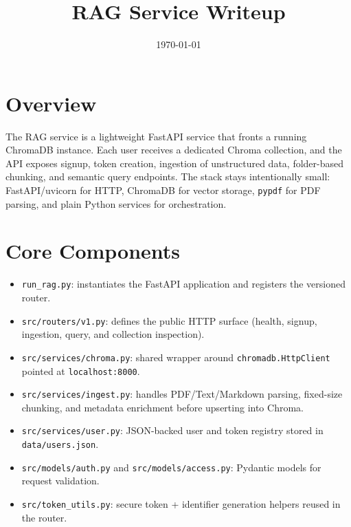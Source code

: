 \documentclass[11pt]{article}
\title{RAG Service Writeup}
\author{}
\date{\today}
\begin{document}
\maketitle

\section{Overview}
The RAG service is a lightweight FastAPI service that fronts a running ChromaDB instance. Each user receives a dedicated Chroma collection, and the API exposes signup, token creation, ingestion of unstructured data, folder-based chunking, and semantic query endpoints. The stack stays intentionally small: FastAPI/uvicorn for HTTP, ChromaDB for vector storage, \texttt{pypdf} for PDF parsing, and plain Python services for orchestration.

\section{Core Components}
\begin{itemize}[leftmargin=*]
  \item \texttt{run\_rag.py}: instantiates the FastAPI application and registers the versioned router.
  \item \texttt{src/routers/v1.py}: defines the public HTTP surface (health, signup, ingestion, query, and collection inspection).
  \item \texttt{src/services/chroma.py}: shared wrapper around \texttt{chromadb.HttpClient} pointed at \texttt{localhost:8000}.
  \item \texttt{src/services/ingest.py}: handles PDF/Text/Markdown parsing, fixed-size chunking, and metadata enrichment before upserting into Chroma.
  \item \texttt{src/services/user.py}: JSON-backed user and token registry stored in \texttt{data/users.json}.
  \item \texttt{src/models/auth.py} and \texttt{src/models/access.py}: Pydantic models for request validation.
  \item \texttt{src/token\_utils.py}: secure token + identifier generation helpers reused in the router.
\end{itemize}
\end{document}
